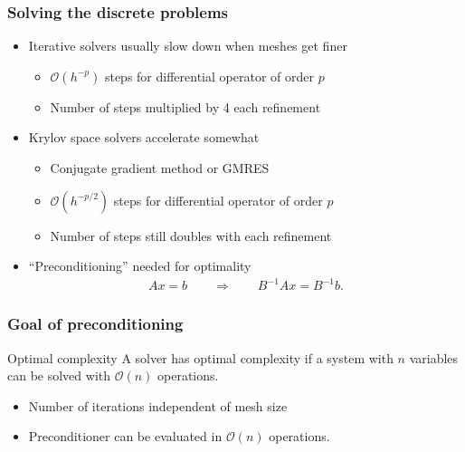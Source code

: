 \begin{frame}
  \frametitle{Solving the discrete problems}
  \begin{itemize}
  \item Iterative solvers usually slow down when meshes get finer
    \begin{itemize}
    \item $\mathcal O(h^{-p})$ steps for differential operator of order $p$
    \item Number of steps multiplied by 4 each refinement
    \end{itemize}
  \item Krylov space solvers accelerate somewhat
    \begin{itemize}
    \item Conjugate gradient method or GMRES
    \item $\mathcal O(h^{-p/2})$ steps for differential operator of order $p$
    \item Number of steps still doubles with each refinement
    \end{itemize}
  \item ``Preconditioning'' needed for optimality
    \begin{gather*}
      Ax=b \qquad \Rightarrow \qquad B^{-1}Ax = B^{-1}b.
    \end{gather*}
  \end{itemize}
\end{frame}

\begin{frame}
  \frametitle{Goal of preconditioning}
  \begin{block}{Optimal complexity}
    A solver has optimal complexity if a system with $n$ variables can
    be solved with $\mathcal O(n)$ operations.
  \end{block}
  \begin{itemize}
  \item Number of iterations independent of mesh size
  \item Preconditioner can be evaluated in $\mathcal O(n)$ operations.
  \end{itemize}
\end{frame}

